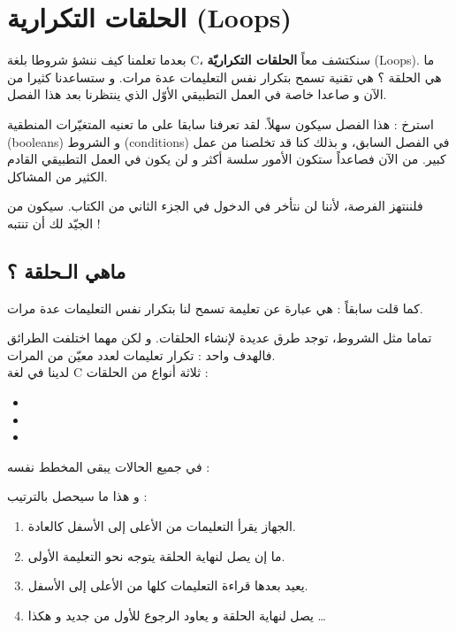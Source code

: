 \chapter{الحلقات التكرارية (\textenglish{Loops})}

بعدما تعلمنا كيف ننشؤ شروطا بلغة 
\textenglish{C}،
سنكتشف معاً 
\textbf{الحلقات التكراريّة} (\textenglish{Loops}).
ما هي الحلقة ؟ هي تقنية تسمح بتكرار نفس التعليمات عدة مرات. و ستساعدنا كثيرا من الآن و صاعدا خاصة في العمل التطبيقي الأوّل الذي ينتظرنا بعد هذا الفصل.

استرخ : هذا الفصل سيكون سهلاً. لقد تعرفنا سابقا على ما تعنيه المتغيّرات المنطقية
(\textenglish{booleans})
و الشروط 
(\textenglish{conditions})
في الفصل السابق، و بذلك كنا قد تخلصنا من عمل كبير. من الآن فصاعداً ستكون الأمور سلسة أكثر و لن يكون في العمل التطبيقي القادم الكثير من المشاكل.

فلننتهز الفرصة، لأننا لن نتأخر في الدخول في الجزء الثاني من الكتاب. سيكون من الجيّد لك أن تنتبه !

\section{ماهي الـحلقة ؟}

كما قلت سابقاً : هي عبارة عن تعليمة تسمح لنا بتكرار نفس التعليمات عدة مرات. 

تماما مثل الشروط، توجد طرق عديدة لإنشاء الحلقات. و لكن مهما اختلفت الطرائق فالهدف واحد : تكرار تعليمات لعدد معيّن من المرات. \\
لدينا في لغة 
\textenglish{C}
ثلاثة أنواع من الحلقات :
\begin{itemize}
	\item {}
	\item {}
	\item {}
\end{itemize}
في جميع الحالات يبقى المخطط نفسه :

و هذا ما سيحصل بالترتيب :

\begin{enumerate}
	\item الجهاز يقرأ التعليمات من الأعلى إلى الأسفل كالعادة.
	\item ما إن يصل لنهاية الحلقة يتوجه نحو التعليمة الأولى.
	\item يعيد بعدها قراءة التعليمات كلها من الأعلى إلى الأسفل.
	\item يصل لنهاية الحلقة و يعاود الرجوع للأول من جديد و هكذا \dots
\end{enumerate}

